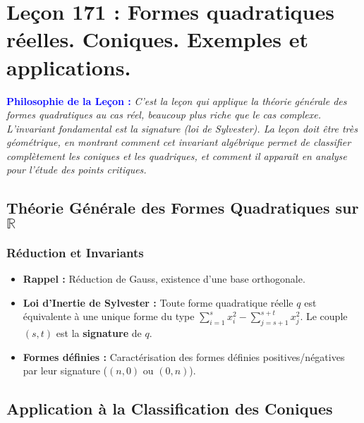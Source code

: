 \documentclass[12pt, a4paper, parskip=full]{report}
\theoremstyle{agregstyle}
\newenvironment{philosophie}
  {\par\medskip\noindent\begin{oframed}\noindent\textbf{\textcolor{blue}{Philosophie de la Leçon :}}\itshape}
  {\end{oframed}\par\medskip}
\begin{document}
\chapter{Leçon 171 : Formes quadratiques réelles. Coniques. Exemples et applications.}

\begin{philosophie}
    C'est la leçon qui applique la théorie générale des formes quadratiques au cas réel, beaucoup plus riche que le cas complexe. L'invariant fondamental est la signature (loi de Sylvester). La leçon doit être très géométrique, en montrant comment cet invariant algébrique permet de classifier complètement les coniques et les quadriques, et comment il apparaît en analyse pour l'étude des points critiques.
\end{philosophie}

\section{Théorie Générale des Formes Quadratiques sur $\mathbb{R}$}
\subsection{Réduction et Invariants}
\begin{itemize}
    \item \textbf{Rappel :} Réduction de Gauss, existence d'une base orthogonale.
    \item \textbf{Loi d'Inertie de Sylvester :} Toute forme quadratique réelle $q$ est équivalente à une unique forme du type $\sum_{i=1}^s x_i^2 - \sum_{j=s+1}^{s+t} x_j^2$. Le couple $(s,t)$ est la \textbf{signature} de $q$.
    \item \textbf{Formes définies :} Caractérisation des formes définies positives/négatives par leur signature ($(n,0)$ ou $(0,n)$).
\end{itemize}

\section{Application à la Classification des Coniques}
\end{document}
